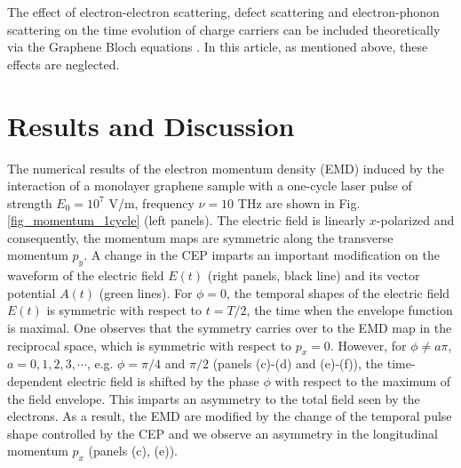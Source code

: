 \documentclass[9pt,twocolumn,twoside]{osajnl}
\begin{document}
The effect of electron-electron scattering, defect scattering and electron-phonon scattering on the time evolution of charge carriers can be included theoretically via the Graphene Bloch equations \cite{PhysRevB.84.205406,PhysRevB.90.245423}. In this article, as mentioned above, these effects are neglected.  

\section{Results and Discussion}\label{section_ResultsDiscussion}

The numerical results of the electron momentum density (EMD) induced by the interaction of a monolayer graphene sample with a one-cycle laser pulse of strength $E_0=10^7$ V/m, frequency $\nu=10$ THz are shown in Fig. \ref{fig_momentum_1cycle} (left panels). The electric field is linearly $x$-polarized and consequently, the momentum maps are symmetric along the transverse momentum $p_y$.  A change in the CEP  imparts an important modification on the waveform of the electric field $E(t)$ (right panels, black line) and its vector potential $A(t)$ (green lines). 
For $\phi=0$, the temporal shapes of the electric field $E(t)$ is symmetric with respect to $t=T/2$, the time when the envelope function is maximal. One observes that the symmetry carries over to the EMD map in the reciprocal space, which is symmetric  with respect to $p_x=0$.
%
However, for  $\phi \ne a\pi$, $a=0,1,2,3,\cdots$, e.g. $\phi=\pi/4$ and $\pi/2$ (panels (c)-(d) and (e)-(f)), the time-dependent electric field is shifted by the phase $\phi$ with respect to the maximum of the field envelope. This imparts  an asymmetry to the total field seen by the electrons.
 As a result, the EMD are  modified by the change of the temporal pulse shape controlled by the CEP and we observe an asymmetry in the longitudinal momentum $p_x$ (panels (c), (e)). 



\end{document}
